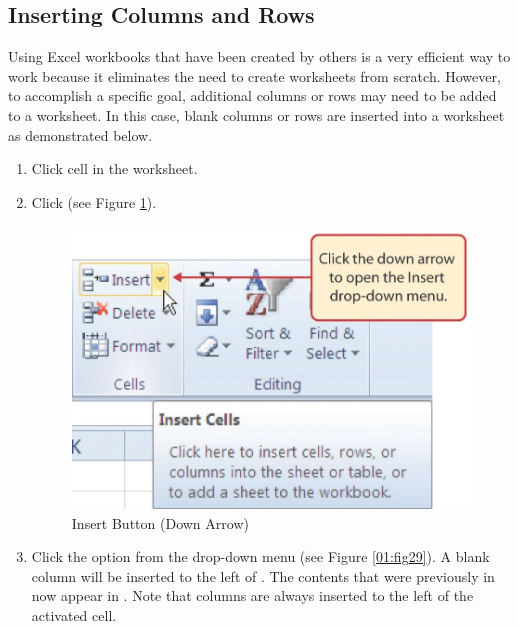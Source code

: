 \subsection{Inserting Columns and Rows}

Using Excel workbooks that have been created by others is a very efficient way to work because it eliminates the need to create worksheets from scratch. However, to accomplish a specific goal, additional columns or rows may need to be added to a worksheet. In this case, blank columns or rows are inserted into a worksheet as demonstrated below.

\begin{enumbox}
	\begin{enumerate}
		\item Click cell  in the  worksheet.
		\item Click  (see Figure \ref{01:fig28}).
	
		\begin{figure}[H]
			\centering
			\includegraphics[width=\maxwidth{.95\linewidth}]{gfx/ch01_fig28}
			\caption{Insert Button (Down Arrow)}
			\label{01:fig28}
		\end{figure}

		\item Click the  option from the drop-down menu (see Figure \ref{01:fig29}). A blank column will be inserted to the left of . The contents that were previously in  now appear in . Note that columns are always inserted to the left of the activated cell.
	\end{enumerate}
\end{enumbox}

